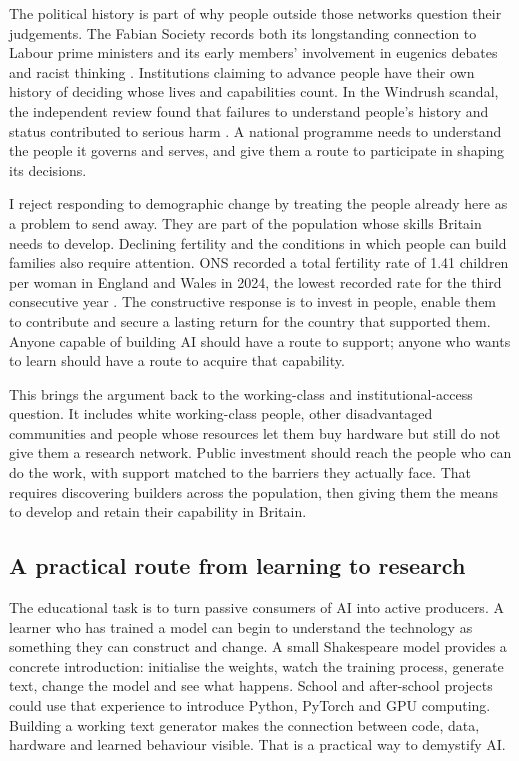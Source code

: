 \documentclass[11pt,a4paper]{article}
\begin{document}
The political history is part of why people outside those networks question
their judgements. The Fabian Society records both its longstanding
connection to Labour prime ministers and its early members' involvement
in eugenics debates and racist thinking \cite{fabianresearch,fabianhistory}.
Institutions claiming to advance people have their own history of deciding
whose lives and capabilities count. In the Windrush scandal, the independent
review found that failures to understand people's history and status
contributed to serious harm \cite{windrush2020}. A national programme needs
to understand the people it governs and serves, and give them a route to
participate in shaping its decisions.

I reject responding to demographic change by treating the people already
here as a problem to send away. They are part of the population whose
skills Britain needs to develop. Declining fertility and the conditions
in which people can build families also require attention. ONS recorded
a total fertility rate of 1.41 children per woman in England and Wales in
2024, the lowest recorded rate for the third consecutive year
\cite{onsfertility2024}. The constructive
response is to invest in people, enable them to contribute and secure a
lasting return for the country that supported them. Anyone capable of
building AI should have a route to support; anyone who wants to learn
should have a route to acquire that capability.

This brings the argument back to the working-class and institutional-access
question. It includes white working-class people, other disadvantaged
communities and people whose resources let them buy hardware but still
do not give them a research network. Public investment should reach the
people who can do the work, with support matched to the barriers they
actually face. That requires discovering builders across the population,
then giving them the means to develop and retain their capability in Britain.

\subsection{A practical route from learning to research}
The educational task is to turn passive consumers of AI into active
producers. A learner who has trained a model can begin to understand the
technology as something they can construct and change. A small Shakespeare
model provides a concrete introduction: initialise the weights, watch the
training process, generate text, change the model and see what happens.
School and after-school projects could use that experience to introduce
Python, PyTorch and GPU computing. Building a working text generator makes
the connection between code, data, hardware and learned behaviour visible.
That is a practical way to demystify AI.
\end{document}
